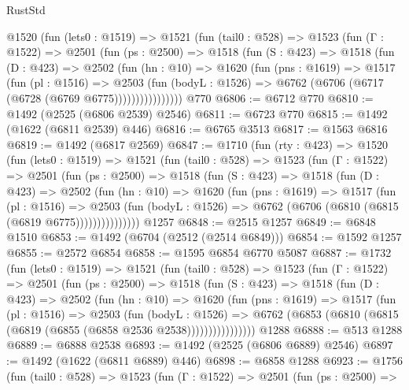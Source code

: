 \begin{lexlean}{RustStd}
\begin{coremodule}
      @1520
        (fun (lets0 : @1519) =>
        @1521
          (fun (tail0 : @528) =>
          @1523
            (fun (Γ : @1522) =>
            @2501
              (fun (ps : @2500) =>
              @1518
                (fun (S : @423) =>
                @1518
                  (fun (D : @423) =>
                  @2502
                    (fun (hn : @10) =>
                    @1620
                      (fun (pns : @1619) =>
                      @1517
                        (fun (pl : @1516) =>
                        @2503
                          (fun (bodyL : @1526) =>
                          @6762 (@6706 (@6717 (@6728 (@6769 @6775))))))))))))))))
    @770
@6806 := @6712 @770
@6810 := @1492 (@2525 (@6806 @2539) @2546)
@6811 := @6723 @770
@6815 := @1492 (@1622 (@6811 @2539) @446)
@6816 := @6765 @3513
@6817 := @1563 @6816
@6819 := @1492 (@6817 @2569)
@6847 := @1710
    (fun (rty : @423) =>
    @1520
      (fun (lets0 : @1519) =>
      @1521
        (fun (tail0 : @528) =>
        @1523
          (fun (Γ : @1522) =>
          @2501
            (fun (ps : @2500) =>
            @1518
              (fun (S : @423) =>
              @1518
                (fun (D : @423) =>
                @2502
                  (fun (hn : @10) =>
                  @1620
                    (fun (pns : @1619) =>
                    @1517
                      (fun (pl : @1516) =>
                      @2503
                        (fun (bodyL : @1526) =>
                        @6762 (@6706 (@6810 (@6815 (@6819 @6775)))))))))))))))
    @1257
@6848 := @2515 @1257
@6849 := @6848 @1510
@6853 := @1492 (@6704 (@2512 (@2514 @6849)))
@6854 := @1592 @1257
@6855 := @2572 @6854
@6858 := @1595 @6854 @6770 @5087
@6887 := @1732
    (fun (lets0 : @1519) =>
    @1521
      (fun (tail0 : @528) =>
      @1523
        (fun (Γ : @1522) =>
        @2501
          (fun (ps : @2500) =>
          @1518
            (fun (S : @423) =>
            @1518
              (fun (D : @423) =>
              @2502
                (fun (hn : @10) =>
                @1620
                  (fun (pns : @1619) =>
                  @1517
                    (fun (pl : @1516) =>
                    @2503
                      (fun (bodyL : @1526) =>
                      @6762 (@6853 (@6810 (@6815 (@6819 (@6855 (@6858 @2536 @2538))))))))))))))))
    @1288
@6888 := @513 @1288
@6889 := @6888 @2538
@6893 := @1492 (@2525 (@6806 @6889) @2546)
@6897 := @1492 (@1622 (@6811 @6889) @446)
@6898 := @6858 @1288
@6923 := @1756
    (fun (tail0 : @528) =>
    @1523
      (fun (Γ : @1522) =>
      @2501
        (fun (ps : @2500) =>

\end{coremodule}
\end{lexlean}
